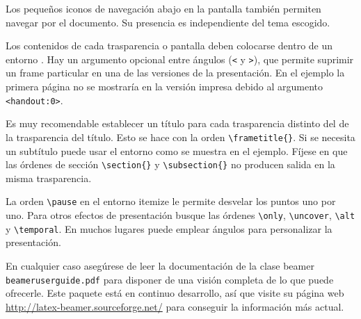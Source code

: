 Los pequeños iconos de navegación abajo en la pantalla también permiten navegar por el documento.  Su presencia es independiente del tema escogido.

Los contenidos de cada trasparencia o pantalla deben colocarse dentro de un entorno .  Hay un argumento opcional entre ángulos (\verb|<| y \verb|>|), que permite suprimir un frame particular en una de las versiones de la presentación.  En el ejemplo la primera página no se mostraría en la versión impresa debido al argumento \verb|<handout:0>|.

Es muy recomendable establecer un título para cada trasparencia distinto del de la trasparencia del título.  Esto se hace con la orden \verb|\frametitle{}|.  Si se necesita un subtítulo puede usar el entorno  como se muestra en el ejemplo.  Fíjese en que las órdenes de sección \verb|\section{}| y \verb|\subsection{}| no producen salida en la misma trasparencia.

La orden \verb|\pause| en el entorno itemize le permite desvelar los puntos uno por uno.  Para otros efectos de presentación busque las órdenes \verb|\only|, \verb|\uncover|, \verb|\alt| y \verb|\temporal|. En muchos lugares puede emplear ángulos para personalizar la presentación.

En cualquier caso asegúrese de leer la documentación de la clase beamer \texttt{beameruserguide.pdf} para disponer de una visión completa de lo que puede ofrecerle.  Este paquete está en continuo desarrollo, así que visite su página web \href{http://latex-beamer.sourceforge.net/}{http://latex-beamer.sourceforge.net/} para conseguir la información más actual.

